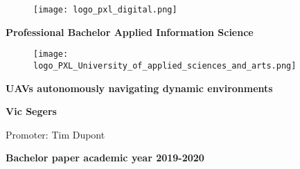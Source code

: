 \begin{titlepage}
  \pagestyle{plain}
  \color{pxlgreen}
  \begin{figure}
    \centering
    \texttt{[image: logo\_pxl\_digital.png]}
  \end{figure}
  \vspace{\baselineskip}
  \begin{center}
    \LARGE\textbf{Professional Bachelor Applied Information Science}
  \end{center}
  \vspace{\baselineskip}
  \begin{figure}[h]
    \centering
    \texttt{[image: logo\_PXL\_University\_of\_applied\_sciences\_and\_arts.png]}
  \end{figure}
  \begin{center}
    \Huge\textbf{UAVs autonomously navigating dynamic environments}
  \end{center}
  \vspace{\baselineskip}
  \begin{center}
    \Large\textbf{Vic Segers}
  \end{center}
  \vspace{\baselineskip}
  \begin{center}
    \large{Promoter: Tim Dupont}
  \end{center}
  \vfill
  \begin{flushright}
    \color{black}\Large\textbf{Bachelor paper academic year 2019-2020}
  \end{flushright}
\end{titlepage}